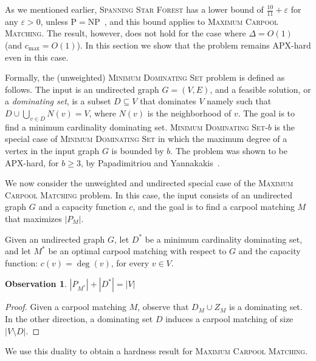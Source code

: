 \documentclass[11pt]{article}
\newtheorem{observation}[lemma]{Observation}
\newcommand{\abs}[1]{\left| #1 \right|}
\newcommand{\carpool}{\textsc{Maximum Carpool Matching}\xspace}
\newcommand{\cmax}{c_{\max}}
\newcommand{\eps}{\varepsilon}
\begin{document}
As we mentioned earlier, \textsc{Spanning Star Forest} has a lower
bound of $\frac{10}{11} + \eps$ for any $\eps > 0$, unless
P$=$NP~\cite{ChakrabartyGoel10}, and this bound applies to \carpool.
%
The result, however, does not hold for the case where $\Delta = O(1)$
(and $\cmax = O(1)$).  In this section we show that the problem remains
APX-hard even in this case.

Formally, the (unweighted) \textsc{Minimum Dominating Set} problem is
defined as follows.  The input is an undirected graph $G = (V,E)$, and
a feasible solution, or a \emph{dominating set}, is a subset
$D \subseteq V$ that dominates $V$ namely such that
$D \cup \bigcup_{v \in D} N(v) = V$, where $N(v)$ is the neighborhood
of $v$.  The goal is to find a minimum cardinality dominating set.
%
\textsc{Minimum Dominating Set-$b$} is the special case of
\textsc{Minimum Dominating Set} in which
the maximum degree of a vertex in the input graph $G$ is bounded by
$b$.  The problem was shown to be APX-hard, for $b \geq 3$, by
Papadimitriou and Yannakakis~\cite{PapYan88}.

We now consider the unweighted and undirected special case of
the \carpool problem.  In this case, the input consists of an
undirected graph $G$ and a capacity function $c$, and the goal is to
find a carpool matching $M$ that maximizes $\abs{P_M}$.

Given an undirected graph $G$, let $D^*$ be a minimum cardinality
dominating set, and let $M^*$ be an optimal carpool matching with
respect to $G$ and the capacity function: $c(v) = \deg(v)$, for every
$v \in V$.

\begin{observation}
$\abs{P_{M^*}} + \abs{D^*} = \abs{V}$ 
\end{observation}
\begin{proof}
Given a carpool matching $M$, observe that $D_M \cup Z_M$ is a
dominating set.  In the other direction, a dominating set $D$ induces
a carpool matching of size $\abs{V \setminus D}$.
\end{proof}

We use this duality to obtain a hardness result for \carpool.
\end{document}
